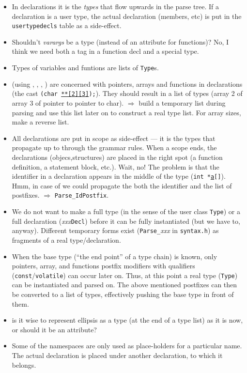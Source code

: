\begin{docpart}
\begin{itemize}
\item In declarations it is the \emph{types} that flow upwards in the
  parse tree. If a declaration is a user type, the actual declaration
  (\ie members, etc) is put in the \texttt{usertypedecls} table as a
  side-effect.
\item Shouldn't \emph{varargs} be a type (instead of an attribute for
  functions)? No, I think we need both a tag in a function decl and a
  special type.
\item Types of variables and funtions are lists of
  \texttt{Type}s.
\item {} (using
  ,
  ,
  ,
  ) are concerned with pointers,
  arrays and functions in declarations (\ie the cast \texttt{(char
    \underline{**[2][3]});}). They should result in a list of types
  (\ie array 2 of array 3 of pointer to pointer to char).
  $\Rightarrow$ build a temporary list during parsing and use this
  list later on to construct a real type list. For array sizes, make a
  reverse list.
\item All declarations are put in scope as side-effect --- it is the
  types that propagate up to through the grammar rules. When a scope
  ends, the declarations (objecs,structures) are placed in the right
  spot (\eg a function definition, a statement block, etc.). Wait, no!
  The problem is that the identifier in a declaration appears in the
  middle of the type (\eg \texttt{int *\underline{a}[]}). Hmm, in case
  of  we could propagate the both the
  identifier and the list of postfixes. $\Rightarrow$
  \texttt{Parse\_IdPostfix}.
\item We do not want to make a full type (in the sense of the user
  class \texttt{Type}) or a full declaration
  (\textsl{xxx}\texttt{Decl}) before it can be fully instantiated (but
  we have to, anyway).  Different temporary forms exist
  (\texttt{Parse\_}\textsl{xxx} in \texttt{syntax.h}) as fragments of
  a real type/declaration.
\item When the base type (\ie ``the end point'' of a type chain) is
  known, only pointers, array, and functions postfix modifiers with
  qualifiers (\texttt{const}/\texttt{volatile}) can occur later on.
  Thus, at this point a real type (\texttt{Type}) can be instantiated
  and parsed on. The above mentioned postfixes can then be converted
  to a list of types, effectively pushing the base type in front of
  them.
\item is it wise to represent ellipsis as a type (at the end of a type
  list) as it is now, or should it be an attribute?
\item Some of the namespaces are only used as place-holders for a
  particular name. The actual declaration is placed under another
  declaration, to which it belongs.
\end{itemize}


\end{docpart}
